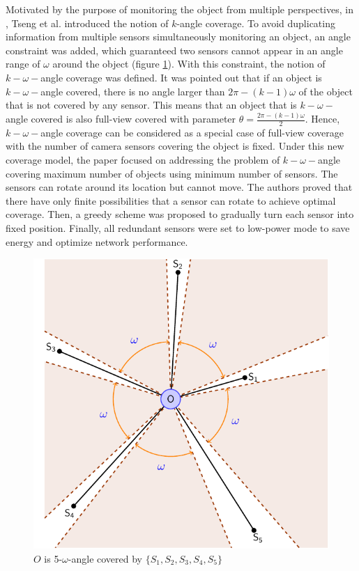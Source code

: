 Motivated by the purpose of monitoring the object from multiple perspectives, in \cite{tseng2012k}, Tseng et al. introduced the notion of $k$-angle coverage. To avoid duplicating information from multiple sensors simultaneously monitoring an object, an angle constraint was added, which guaranteed two sensors cannot appear in an angle range of $\omega$ around the object (figure \ref{fig:02}). With this constraint, the notion of $k-\omega-$angle coverage was defined. It was pointed out that if an object is $k-\omega-$angle covered, there is no angle larger than $2\pi-(k-1)\omega$ of the object that is not covered by any sensor. This means that an object that is $k-\omega-$angle covered is also full-view covered with parameter $\theta=\displaystyle\frac{2\pi-(k-1)\omega}{2}$. Hence, $k-\omega-$angle coverage can be considered as a special case of full-view coverage with the number of camera sensors covering the object is fixed. Under this new coverage model, the paper focused on addressing the problem of $k-\omega-$angle covering maximum number of objects using minimum number of sensors. The sensors can rotate around its location but cannot move. The authors proved that there have only finite possibilities that a sensor can rotate to achieve optimal coverage. Then, a greedy scheme was proposed to gradually turn each sensor into fixed position. Finally, all redundant sensors were set to low-power mode to save energy and optimize network performance.
\begin{figure}[p]
	\centering
	\includegraphics[scale=.7]{komega.pdf}
	\caption{$O$ is 5-$\omega$-angle covered by $\{S_1, S_2, S_3, S_4, S_5\}$}
	\label{fig:02}
\end{figure}

